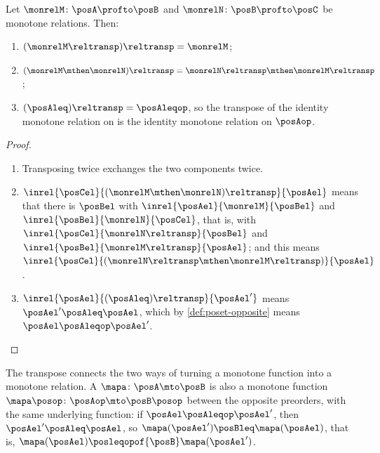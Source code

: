 \begin{lemma}
    \label{lem:monrel-transpose-properties}
    Let $\monrelM \colon \posA \profto \posB$ and $\monrelN \colon \posB \profto \posC$ be monotone relations.
    Then:
    \begin{enumerate}
        \item $(\monrelM\reltransp)\reltransp = \monrelM$;
        \item $(\monrelM \mthen \monrelN)\reltransp = \monrelN\reltransp \mthen \monrelM\reltransp$;
        \item $(\posAleq)\reltransp = \posAleqop$, so the transpose of the identity monotone relation on \posA is the identity monotone relation on $\posAop$.
    \end{enumerate}
\end{lemma}
\begin{proof}
    \begin{enumerate}
        \item Transposing twice exchanges the two components twice.
        \item $\inrel{\posCel}{(\monrelM \mthen \monrelN)\reltransp}{\posAel}$ means that there is $\posBel$ with $\inrel{\posAel}{\monrelM}{\posBel}$ and $\inrel{\posBel}{\monrelN}{\posCel}$, that is, with $\inrel{\posCel}{\monrelN\reltransp}{\posBel}$ and $\inrel{\posBel}{\monrelM\reltransp}{\posAel}$; and this means $\inrel{\posCel}{(\monrelN\reltransp \mthen \monrelM\reltransp)}{\posAel}$.
        \item $\inrel{\posAel}{(\posAleq)\reltransp}{\posAel'}$ means $\posAel' \posAleq \posAel$, which by \cref{def:poset-opposite} means $\posAel \posAleqop \posAel'$.
    \end{enumerate}
\end{proof}

The transpose connects the two ways of turning a monotone function into a monotone relation.
A  $\mapa \colon \posA \mto \posB$ is also a monotone function $\mapa\posop \colon \posAop \mto \posB\posop$ between the opposite preorders, with the same underlying function: if $\posAel \posAleqop \posAel'$, then $\posAel' \posAleq \posAel$, so $\mapa(\posAel') \posBleq \mapa(\posAel)$, that is, $\mapa(\posAel) \posleqopof{\posB} \mapa(\posAel')$.

